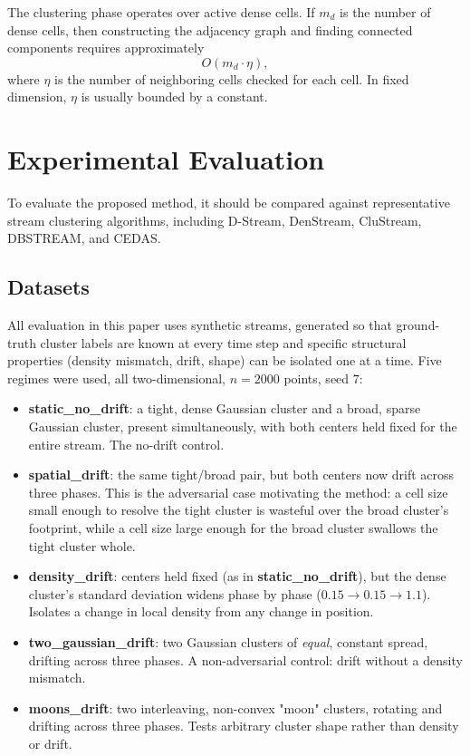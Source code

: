 \documentclass[11pt]{article}
\begin{document}
The clustering phase operates over active dense cells. If $m_d$ is the number of dense cells, then constructing the adjacency graph and finding connected components requires approximately
\[
O(m_d \cdot \eta),
\]
where $\eta$ is the number of neighboring cells checked for each cell. In fixed dimension, $\eta$ is usually bounded by a constant.

\section{Experimental Evaluation}

To evaluate the proposed method, it should be compared against representative stream clustering algorithms, including D-Stream, DenStream, CluStream, DBSTREAM, and CEDAS.

\subsection{Datasets}

All evaluation in this paper uses synthetic streams, generated so that ground-truth cluster labels are known at every time step and specific structural properties (density mismatch, drift, shape) can be isolated one at a time. Five regimes were used, all two-dimensional, $n{=}2000$ points, seed $7$:

\begin{itemize}
    \item \textbf{static\_no\_drift}: a tight, dense Gaussian cluster and a broad, sparse Gaussian cluster, present simultaneously, with both centers held fixed for the entire stream. The no-drift control.
    \item \textbf{spatial\_drift}: the same tight/broad pair, but both centers now drift across three phases. This is the adversarial case motivating the method: a cell size small enough to resolve the tight cluster is wasteful over the broad cluster's footprint, while a cell size large enough for the broad cluster swallows the tight cluster whole.
    \item \textbf{density\_drift}: centers held fixed (as in \textbf{static\_no\_drift}), but the dense cluster's standard deviation widens phase by phase ($0.15 \to 0.15 \to 1.1$). Isolates a change in local density from any change in position.
    \item \textbf{two\_gaussian\_drift}: two Gaussian clusters of \emph{equal}, constant spread, drifting across three phases. A non-adversarial control: drift without a density mismatch.
    \item \textbf{moons\_drift}: two interleaving, non-convex "moon" clusters, rotating and drifting across three phases. Tests arbitrary cluster shape rather than density or drift.
\end{itemize}
\end{document}
